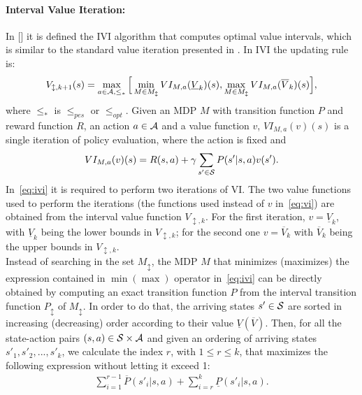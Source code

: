 \paragraph{Interval Value Iteration:}
In [\cite{givan2000bounded}] it is defined the \acf{IVI} algorithm that computes optimal value intervals, which is similar to the standard value iteration presented in . In \ac{IVI} the updating rule is:
\begin{align}
V_{\updownarrow, k+1}(s) = \max_{a \in \mathcal{A}, \leq_{*}} \Big[ \min_{M \in M_{\updownarrow}} VI_{M, a}(\underline{V}_{k})(s), \max_{M \in M_{\updownarrow}} VI_{M, a}(\overline{V}_{k})(s) \Big], \label{eq:ivi}
\end{align}
where $\leq_{*}$ is $\leq_{pes}$ or $\leq_{opt}$. Given an \ac{MDP} $M$ with transition function $P$ and reward function $R$, an action $a \in \mathcal{A}$ and a value function $v$, $VI_{M, a}(v)(s)$ is a single iteration of policy evaluation, where the action is fixed and 
\begin{align} 
VI_{M, a}(v)(s) = R(s,a) + \gamma \sum_{s' \in \mathcal{S}} P(s'|s,a)v(s'). \label{eq:vi}
\end{align}
In~\eqref{eq:ivi} it is required to perform two iterations of VI. The two value functions used to perform the iterations (\ie the functions used instead of $v$ in~\eqref{eq:vi}) are obtained from the interval value function $V_{\updownarrow, k}$. For the first iteration, $v = \underline{V}_{k}$, with $\underline{V}_{k}$ being the lower bounds in $V_{\updownarrow, k}$; for the second one $v = \overline{V}_{k}$ with $\overline{V}_{k}$ being the upper bounds in $V_{\updownarrow, k}$.\\
\newline
Instead of searching in the set $M_{\updownarrow}$, the \ac{MDP} $M$ that minimizes (maximizes) the expression contained in $\min (\max)$ operator in~\eqref{eq:ivi} can be directly obtained by computing an exact transition function $P$ from the interval transition function $P_{\updownarrow}$ of $M_{\updownarrow}$. In order to do that, the arriving states $s' \in \mathcal{S}$ are sorted in increasing (decreasing) order according to their value $\underline{V}(\overline{V})$. Then, for all the state-action pairs $(s,a) \in \mathcal{S} \times \mathcal{A}$ and given an ordering of arriving states $s'_1, s'_2, ..., s'_k$, we calculate the index $r$, with $1 \leq r \leq k$, that maximizes the following expression without letting it exceed 1:
\begin{align} \sum_{i=1}^{r-1}\overline{P}(s'_i|s,a) + \sum_{i=r}^{k}\underline{P}(s'_i|s,a). \end{align}

